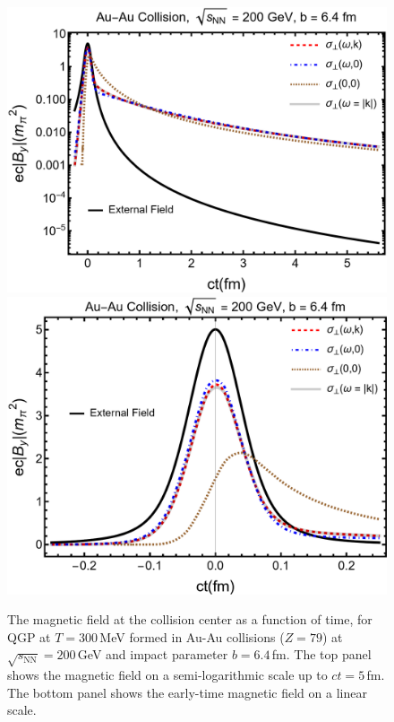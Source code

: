\begin{figure}%
\centering              
\hspace{-0.04\linewidth}
\includegraphics[width=0.955\linewidth]{plots/bf100.png}\\[0.4cm]
\hspace{0.02\linewidth}
\includegraphics[width=0.89\linewidth]{plots/bf100lin.png}
\caption{The magnetic field at the collision center as a function of time, for QGP at $T = 300$\,MeV formed in Au-Au collisions ($Z=79$) at $\sqrt{s_\text{NN}} = 200$\,GeV and impact parameter $b = 6.4\,$fm. The top panel shows the magnetic field on a semi-logarithmic scale up to $ct = 5$\,fm. The bottom panel shows the early-time magnetic field on a linear scale. \label{fig:bfcomp}}
\end{figure}

